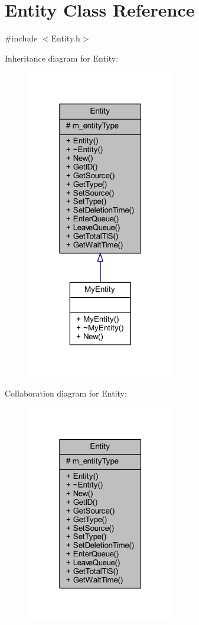 \hypertarget{class_entity}{}\section{Entity Class Reference}
\label{class_entity}


{\ttfamily \#include $<$Entity.\+h$>$}



Inheritance diagram for Entity\+:
\nopagebreak
\begin{figure}[H]
\begin{center}
\leavevmode
\includegraphics[width=183pt]{class_entity__inherit__graph}
\end{center}
\end{figure}


Collaboration diagram for Entity\+:
\nopagebreak
\begin{figure}[H]
\begin{center}
\leavevmode
\includegraphics[width=183pt]{class_entity__coll__graph}
\end{center}
\end{figure}
